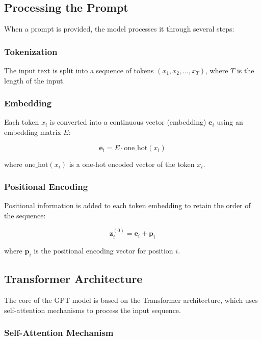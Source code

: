 \documentclass[12pt]{article}
\begin{document}
\subsection{Processing the Prompt}

When a prompt is provided, the model processes it through several steps:

\subsubsection{Tokenization}

The input text is split into a sequence of tokens \( (x_1, x_2, \dots, x_T) \), where \( T \) is the length of the input.

\subsubsection{Embedding}

Each token \( x_i \) is converted into a continuous vector (embedding) \( \mathbf{e}_i \) using an embedding matrix \( E \):

\[
\mathbf{e}_i = E \cdot \text{one\_hot}(x_i)
\]

where \( \text{one\_hot}(x_i) \) is a one-hot encoded vector of the token \( x_i \).

\subsubsection{Positional Encoding}

Positional information is added to each token embedding to retain the order of the sequence:

\[
\mathbf{z}_i^{(0)} = \mathbf{e}_i + \mathbf{p}_i
\]

where \( \mathbf{p}_i \) is the positional encoding vector for position \( i \).

\subsection{Transformer Architecture}

The core of the GPT model is based on the Transformer architecture, which uses self-attention mechanisms to process the input sequence.

\subsubsection{Self-Attention Mechanism}
\end{document}
